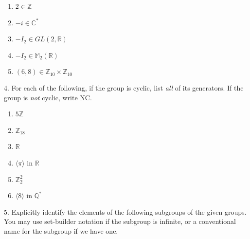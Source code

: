 \documentclass[10pt,openany,oneside]{book}
\theoremstyle{plain}
\theoremstyle{definition}
\theoremstyle{definition}
\theoremstyle{definition}
\theoremstyle{definition}
\numberwithin{equation}{section}
\def\Z{\mathbb{Z}}
\def\R{\mathbb{R}}
\def\Q{\mathbb{Q}}
\def\C{\mathbb{C}}
\def\M{\mathbb{M}}
\newcommand{\amp}{&}
\begin{document}
\begin{exerciselist}
\begin{enumerate}[label=(\alph*)]
\item\hypertarget{li-287}{}\(2\in \Z\)%
\item\hypertarget{li-288}{}\(-i\in \C^*\)%
\item\hypertarget{li-289}{}\(-I_2\in GL(2,\R)\)%
\item\hypertarget{li-290}{}\(-I_2\in \M_2(\R)\)%
\item\hypertarget{li-291}{}\((6,8)\in \Z_{10}\times \Z_{10}\)%
\end{enumerate}
%
\par\smallskip
\item[4.]\hypertarget{exercise-37}{}For each of the following, if the group is cyclic, list \emph{all} of its generators. If the group is \emph{not} cyclic, write NC. \leavevmode%
\begin{enumerate}[label=(\alph*)]
\item\hypertarget{li-297}{}\(5\Z\)%
\item\hypertarget{li-298}{}\(\Z_{18}\)%
\item\hypertarget{li-299}{}\(\R\)%
\item\hypertarget{li-300}{}\(\langle \pi\rangle\) in \(\R\)%
\item\hypertarget{li-301}{}\(\Z_2^2\)%
\item\hypertarget{li-302}{}\(\langle 8\rangle\) in \(\Q^*\)%
\end{enumerate}
%
\par\smallskip
\item[5.]\hypertarget{exercise-38}{}Explicitly identify the elements of the following subgroups of the given groups. You may use set-builder notation if the subgroup is infinite, or a conventional name for the subgroup if we have one. \leavevmode%
\begin{enumerate}[label=(\alph*)]
\item\hypertarget{li-309}{}\(\langle 3\rangle\) in \(\Z\)%
\item\hypertarget{li-310}{}\(\langle i\rangle\) in \(C^*\)%
\item\hypertarget{li-311}{}\(\langle A\rangle\), for \(A=\left[ \begin{array}{cc}
1 \amp  0 \\
0 \amp  0
\end{array}
\right]\in \M_2(\R)\)%
\item\hypertarget{li-312}{}\(\langle (2,3)\rangle\) in \(\Z_4\times \Z_5\)%
\item\hypertarget{li-313}{}\(\langle B\rangle\), for \(B=\left[ \begin{array}{cc}

\end{array}
\end{enumerate}
\end{exerciselist}
\end{document}
